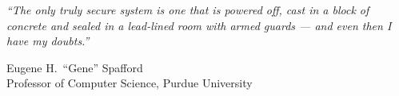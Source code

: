 \pagestyle{empty}

\null\vfill

\textit{``The only truly secure system is one that is powered off, cast in a block of concrete and sealed in a lead-lined room with armed guards --- and even then I have my doubts.''}

\begin{flushright}
	Eugene H.\ ``Gene'' Spafford\\
	Professor of Computer Science, Purdue University
\end{flushright}

\vfill\vfill\vfill\vfill\vfill\vfill\null
\clearpage
